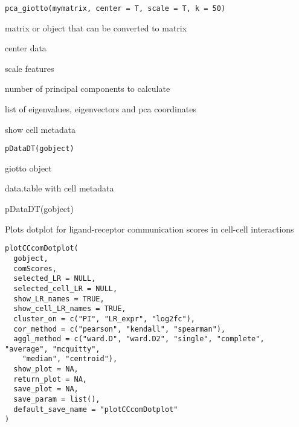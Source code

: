 \documentclass[a4paper]{book}
\begin{document}
%
\begin{Usage}
\begin{verbatim}
pca_giotto(mymatrix, center = T, scale = T, k = 50)
\end{verbatim}
\end{Usage}
%
\begin{Arguments}
\begin{ldescription}
\item[\code{mymatrix}] matrix or object that can be converted to matrix

\item[\code{center}] center data

\item[\code{scale}] scale features

\item[\code{k}] number of principal components to calculate
\end{ldescription}
\end{Arguments}
%
\begin{Value}
list of eigenvalues, eigenvectors and pca coordinates
\end{Value}
%
\begin{Description}\relax
show cell metadata
\end{Description}
%
\begin{Usage}
\begin{verbatim}
pDataDT(gobject)
\end{verbatim}
\end{Usage}
%
\begin{Arguments}
\begin{ldescription}
\item[\code{gobject}] giotto object
\end{ldescription}
\end{Arguments}
%
\begin{Value}
data.table with cell metadata
\end{Value}
%
\begin{Examples}
\begin{ExampleCode}
    pDataDT(gobject)
\end{ExampleCode}
\end{Examples}
%
\begin{Description}\relax
Plots dotplot for ligand-receptor communication scores in cell-cell interactions
\end{Description}
%
\begin{Usage}
\begin{verbatim}
plotCCcomDotplot(
  gobject,
  comScores,
  selected_LR = NULL,
  selected_cell_LR = NULL,
  show_LR_names = TRUE,
  show_cell_LR_names = TRUE,
  cluster_on = c("PI", "LR_expr", "log2fc"),
  cor_method = c("pearson", "kendall", "spearman"),
  aggl_method = c("ward.D", "ward.D2", "single", "complete", "average", "mcquitty",
    "median", "centroid"),
  show_plot = NA,
  return_plot = NA,
  save_plot = NA,
  save_param = list(),
  default_save_name = "plotCCcomDotplot"
)
\end{verbatim}
\end{Usage}
\end{document}
